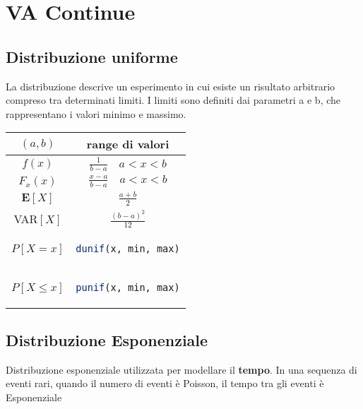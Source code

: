 \chapter{VA Continue}
\section{Distribuzione uniforme}
\begin{tcolorbox}
La distribuzione descrive un esperimento in cui esiste un risultato arbitrario compreso tra determinati limiti. I limiti sono definiti dai parametri a e b, che rappresentano i valori minimo e massimo.
\end{tcolorbox}

\begingroup
\setlength{\tabcolsep}{10pt} %
\renewcommand{\arraystretch}{1.5} %
\begin{center}
\begin{tabular}{ |c|c| } 
\hline
\((a, b)\) & range di valori \\ \hline
\(f(x)\) & $\frac{1}{b - a} \quad a < x < b$ \\ \hline
\(F_x(x)\) & $\frac{x - a}{b - a} \quad a < x < b$ \\ \hline
\(\mathbf{E}[X]\) & \(\frac{a + b}{2}\) \\ \hline
VAR\([X]\) & \(\frac{(b - a)^2}{12}\) \\ \hline\hline
\(P[X = x]\) & \begin{lstlisting}[language=R]
dunif(x, min, max)
\end{lstlisting} \\ \hline
\(P[X \leq x]\) & \begin{lstlisting}[language=R]
punif(x, min, max)
\end{lstlisting} \\ \hline
\end{tabular}
\end{center}
\endgroup

\newpage
\section{Distribuzione Esponenziale}
\begin{tcolorbox}
Distribuzione esponenziale utilizzata per modellare il \textbf{tempo}. In una sequenza di eventi rari, quando il numero di eventi è Poisson, il tempo tra gli eventi è Esponenziale
\end{tcolorbox}

